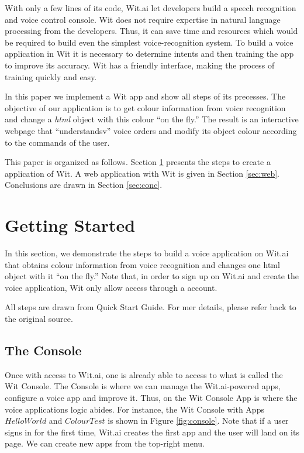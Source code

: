 \documentclass[twoside,11pt]{article}
\begin{document}
With only a few lines of its code, Wit.ai let developers build a speech recognition and voice control console.
Wit does not require expertise in natural language processing from the developers.
Thus, it can save time and resources which would be required to build even the simplest voice-recognition system.
To build a voice application in Wit it is necessary to determine intents and then training the app to improve its accuracy.
Wit has a friendly interface, making the process of training quickly and easy.

In this paper we implement a Wit app and show all steps of its precesses.
The objective of our application is to get colour information from voice recognition and change a \emph{html} object with this colour ``on the fly.''
The result is an interactive webpage that ``understandsv'' voice orders and modify its object colour according to the commands of the user.


This paper is organized as follows.
Section \ref{sec:get} presents the steps to create a application of Wit.
A web application with Wit is given in Section \ref{sec:web}.
Conclusions are drawn in Section \ref{sec:conc}.

\section{Getting Started}
\label{sec:get}


In this section, we demonstrate the steps to build a voice application on Wit.ai that obtains colour information from voice recognition and changes one html object with it ``on the fly.''
Note that, in order to sign up on Wit.ai and create the voice application, Wit only allow access through a \cite{github_2016} account.

All steps are drawn from \cite{1_wit.ai_2016} Quick Start Guide.
For mer details, please refer back to the original source.

\subsection{The Console}

Once with access to Wit.ai, one is already able to access to what is called the Wit Console. 
The Console is where we can manage the Wit.ai-powered apps, configure a voice app and improve it.
Thus, on the Wit Console App is where the voice applications logic abides.
For instance, the Wit Console with Apps $HelloWorld$ and $ColourTest$ is shown in Figure \ref{fig:console}.
Note that if a user signs in for the first time, Wit.ai creates the first app and the user will land on its page.
We can create new apps from the top-right menu.
\end{document}
